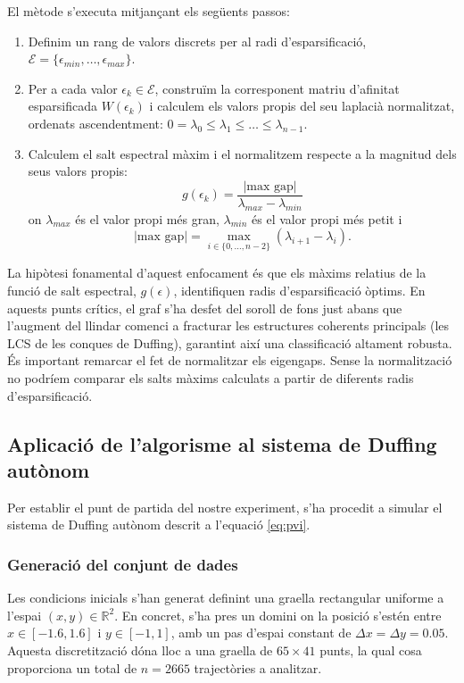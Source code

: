 \documentclass[12,twoside]{TFG-GM}
\theoremstyle{definition}
\theoremstyle{remark}
\newcommand{\R}{\mathbb{R}}
\begin{document}
El mètode s'executa mitjançant els següents passos:
\begin{enumerate}
    \item Definim un rang de valors discrets per al radi d'esparsificació, $\mathcal{E} = \{\epsilon_{min}, \dots, \epsilon_{max}\}$.
    \item Per a cada valor $\epsilon_k \in \mathcal{E}$, construïm la corresponent matriu d'afinitat esparsificada $W(\epsilon_k)$ i calculem els valors propis del seu laplacià normalitzat, ordenats ascendentment: $0 = \lambda_0 \leq \lambda_1 \leq \dots \leq \lambda_{n-1}$.
    \item Calculem el salt espectral màxim i el normalitzem respecte a la magnitud dels seus valors propis:
    \begin{equation}
        g(\epsilon_k) = \frac{|\text{max gap}|}{\lambda_{max} - \lambda_{min}}
    \end{equation}
    on $\lambda_{max}$ és el valor propi més gran, $\lambda_{min}$ és el valor propi més petit i 
    $$|\text{max gap}|=\max_{i\in \{0,\dots,n-2\}} (\lambda_{i+1} - \lambda_i).$$
\end{enumerate}

La hipòtesi fonamental d'aquest enfocament és que els màxims relatius de la funció de salt espectral, $g(\epsilon)$, identifiquen radis d'esparsificació òptims. En aquests punts crítics, el graf s'ha desfet del soroll de fons just abans que l'augment del llindar comenci a fracturar les estructures coherents principals (les LCS de les conques de Duffing), garantint així una classificació altament robusta. És important remarcar el fet de normalitzar els eigengaps. Sense la normalització no podríem comparar els salts màxims calculats a partir de diferents radis d'esparsificació.





\subsection{Aplicació de l'algorisme al sistema de Duffing autònom}

Per establir el punt de partida del nostre experiment, s'ha procedit a simular el sistema de Duffing autònom descrit a l'equació \eqref{eq:pvi}. 



\subsubsection{Generació del conjunt de dades}
Les condicions inicials s'han generat definint una graella rectangular uniforme a l'espai $(x,y)\in\R^2$. En concret, s'ha pres un domini on la posició s'estén entre $x \in [-1.6, 1.6]$ i $y \in [-1, 1]$, amb un pas d'espai constant de $\Delta x = \Delta y = 0.05$. Aquesta discretització dóna lloc a una graella de $65 \times 41$ punts, la qual cosa proporciona un total de $n = 2665$ trajectòries a analitzar.
\end{document}
